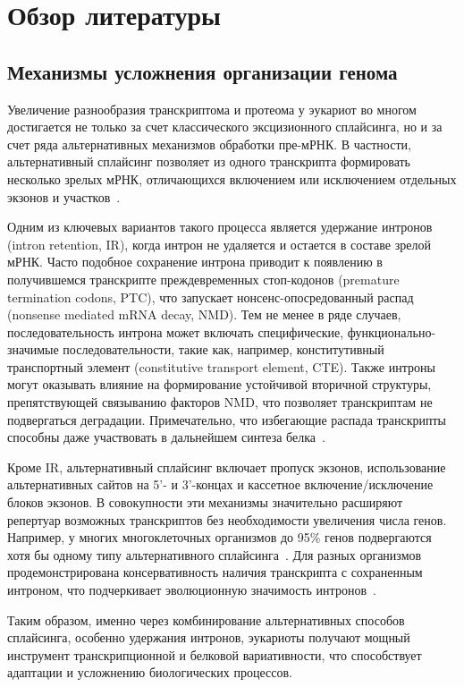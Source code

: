 \clearpage
\section{Обзор литературы}

\subsection{Механизмы усложнения организации генома}

Увеличение разнообразия транскриптома и протеома у эукариот во многом достигается не только за счет классического эксцизионного сплайсинга, но и за счет ряда альтернативных механизмов обработки пре-мРНК.
В частности, альтернативный сплайсинг позволяет из одного транскрипта формировать несколько зрелых мРНК, отличающихся включением или исключением отдельных экзонов и участков~\cite{Mamon2019,Juneau2006}.

Одним из ключевых вариантов такого процесса является удержание интронов (intron retention, IR), когда интрон не удаляется и остается в составе зрелой мРНК.
Часто подобное сохранение интрона приводит к появлению в получившемся транскрипте преждевременных стоп-кодонов (premature termination codons, PTC), что запускает нонсенс-опосредованный распад (nonsense mediated mRNA decay, NMD).
Тем не менее в ряде случаев, последовательность интрона может включать специфические, функционально-значимые последовательности, такие как, например, конститутивный транспортный элемент (constitutive transport element, CTE).
Также интроны могут оказывать влияние на формирование устойчивой вторичной структуры, препятствующей связыванию факторов NMD, что позволяет транскриптам не подвергаться деградации.
Примечательно, что избегающие распада транскрипты способны даже участвовать в дальнейшем синтеза белка~\cite{Mamon2013,Jo2015,Kalyna2012}.

Кроме IR, альтернативный сплайсинг включает пропуск экзонов, использование альтернативных сайтов на 5'- и 3'-концах и кассетное включение/исключение блоков экзонов.
В совокупности эти механизмы значительно расширяют репертуар возможных транскриптов без необходимости увеличения числа генов.
Например, у многих многоклеточных организмов до 95\% генов подвергаются хотя бы одному типу альтернативного сплайсинга~\cite{Mamon2019}.
Для разных организмов продемонстрирована консервативность наличия транскрипта с сохраненным интроном, что подчеркивает эволюционную значимость интронов~\cite{Mamon2013}.

Таким образом, именно через комбинирование альтернативных способов сплайсинга, особенно удержания интронов, эукариоты получают мощный инструмент транскрипционной и белковой вариативности, что способствует адаптации и усложнению биологических процессов.



